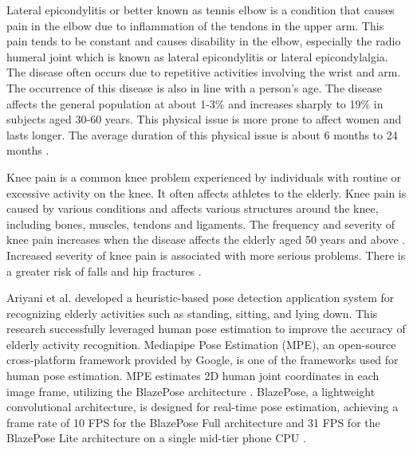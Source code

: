 Lateral epicondylitis or better known as tennis elbow is a condition that causes pain in the elbow due to inflammation of the tendons in the upper arm. This pain tends to be constant and causes disability in the elbow, especially the radio humeral joint which is known as lateral epicondylitis or lateral epicondylalgia. The disease often occurs due to repetitive activities involving the wrist and arm. The occurrence of this disease is also in line with a person's age. The disease affects the general population at about 1-3\% and increases sharply to 19\% in subjects aged 30-60 years. This physical issue is more prone to affect women and lasts longer. The average duration of this physical issue is about 6 months to 24 months \cite{TennisElbow4}.

Knee pain is a common knee problem experienced by individuals with routine or excessive activity on the knee. It often affects athletes to the elderly. Knee pain is caused by various conditions and affects various structures around the knee, including bones, muscles, tendons and ligaments. The frequency and severity of knee pain increases when the disease affects the elderly aged 50 years and above \cite{KneePain7}. Increased severity of knee pain is associated with more serious problems. There is a greater risk of falls and hip fractures \cite{KneePain6}.

Ariyani et al. \cite{Heuristic} developed a heuristic-based pose detection application system for recognizing elderly activities such as standing, sitting, and lying down. This research successfully leveraged human pose estimation to improve the accuracy of elderly activity recognition. Mediapipe Pose Estimation (MPE), an open-source cross-platform framework provided by Google, is one of the frameworks used for human pose estimation. MPE estimates 2D human joint coordinates in each image frame, utilizing the BlazePose architecture \cite{BlazePose}. BlazePose, a lightweight convolutional architecture, is designed for real-time pose estimation, achieving a frame rate of 10 FPS for the BlazePose Full architecture and 31 FPS for the BlazePose Lite architecture on a single mid-tier phone CPU \cite{BlazeFace}.

